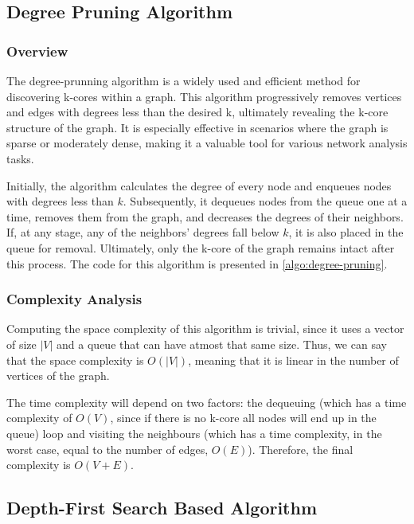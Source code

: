 \label{Algorithms}

\subsection{Degree Pruning Algorithm}

\subsubsection{Overview}

The degree-prunning algorithm is a widely used and efficient method for discovering k-cores within a graph. This algorithm progressively removes vertices and edges with degrees less than the desired k, ultimately revealing the k-core structure of the graph. It is especially effective in scenarios where the graph is sparse or moderately dense, making it a valuable tool for various network analysis tasks. 

Initially, the algorithm calculates the degree of every node and enqueues nodes with degrees less than $k$. Subsequently, it dequeues nodes from the queue one at a time, removes them from the graph, and decreases the degrees of their neighbors. If, at any stage, any of the neighbors' degrees fall below $k$, it is also placed in the queue for removal. Ultimately, only the k-core of the graph remains intact after this process. The code for this algorithm is presented in \ref{algo:degree-pruning}.



\subsubsection{Complexity Analysis}

Computing the space complexity of this algorithm is trivial, since it uses a vector of size $|V|$ and a queue that can have atmost that same size. Thus, we can say that the space complexity is $O(|V|)$, meaning that it is linear in the number of vertices of the graph.

The time complexity will depend on two factors: the dequeuing (which has a time complexity of $O(V)$, since if there is no k-core all nodes will end up in the queue) loop and visiting the neighbours (which has a time complexity, in the worst case, equal to the number of edges, $O(E)$). Therefore, the final complexity is $O(V + E)$.

\subsection{Depth-First Search Based Algorithm}

